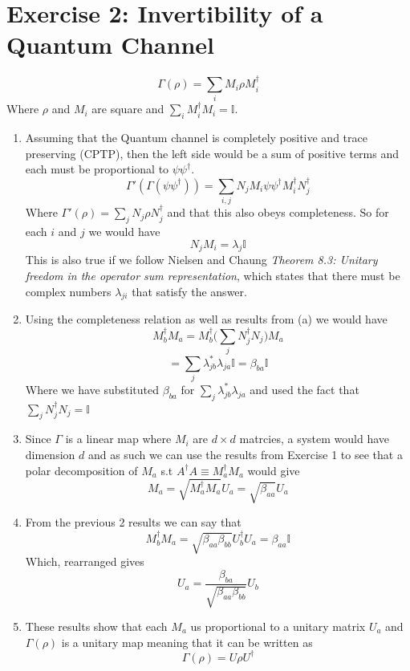 \documentclass[12pt]{article}
\begin{document}
\section{Exercise 2: Invertibility of a Quantum Channel}
$$ \Gamma (\rho ) = \sum_i M_i \rho M_i^{\dagger} $$
Where $\rho$ and $M_i$ are square and $\sum_i M_i^{\dagger} M_i = \mathbb{I} $.
\begin{enumerate}
    \item Assuming that the Quantum channel is completely positive and trace preserving (CPTP), then the left side would be a sum of positive terms and each must be proportional to $\psi \psi^{\dagger} $. 
    $$ \Gamma' ( \Gamma ( \psi \psi^{\dagger} ))= \sum_{i,j} N_j M_i \psi \psi^{\dagger} M_i^{\dagger} N_j^{\dagger} $$
    Where $\Gamma' (\rho) = \sum_j N_j \rho N_j^{\dagger}$ and that this also obeys completeness. 
    So for each $i$ and $j$ we would have 
    $$ N_j M_i =\lambda_j \mathbb{I}  $$
    This is also true if we follow Nielsen and Chaung \emph{Theorem 8.3: Unitary freedom in the operator sum representation}, which states that there must be complex numbers $\lambda_{ji}$ that satisfy the answer. 

    \item Using the completeness relation as well as results from (a) we would have 
    $$ M_b^{\dagger} M_a = M_b^{\dagger} \Big( \sum_j N_j^{\dagger} N_j \Big) M_a $$
    $$ = \sum_j \lambda_{jb}^* \lambda_{ja} \mathbb{I} = \beta_{ba} \mathbb{I} $$
    Where we have substituted $\beta_{ba}$ for $ \sum_j \lambda^*_{jb} \lambda_{ja}$ and used the fact that $\sum_j N_j^{\dagger} N_j = \mathbb{I}$

    \item Since $\Gamma$ is a linear map where $M_i$ are $d \times d$ matrcies, a system would have dimension $d$ and as such we can use the results from Exercise 1 to see that a polar decomposition of $M_a$ s.t $A^{\dagger} A \equiv M_a^{\dagger} M_a$ would give 
    $$ M_a = \sqrt{M_a^{\dagger} M_a} U_a = \sqrt{\beta_{aa}} U_a $$

    \item From the previous 2 results we can say that 
    $$ M_b^{\dagger} M_a = \sqrt{\beta_{aa} \beta_{bb}} U_b^{\dagger} U_a = \beta_{aa} \mathbb{I} $$
    Which, rearranged gives 
    $$ U_a = \frac{\beta_{ba}}{\sqrt{\beta_{aa} \beta_{bb}}} U_b $$

    \item These results show that each $M_a$ us proportional to a unitary matrix $U_a$ and $\Gamma (\rho)$ is a unitary map meaning that it can be written as 
    $$ \Gamma (\rho) = U \rho U^{\dagger} $$
\end{enumerate}
\end{document}
